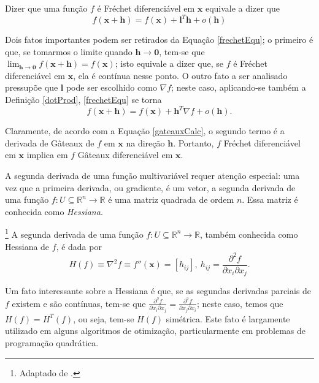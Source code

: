 Dizer que uma fun\c{c}\~{a}o $f$ \'{e} Fr\'{e}chet diferenci\'{a}vel em $\mathbf{x}$ equivale a dizer que
\begin{equation}
\label{frechetEqu}
f(\mathbf{x} + \mathbf{h}) = f(\mathbf{x}) + \mathbf{l}^T\mathbf{h} + o(\mathbf{h})
\end{equation}

Dois fatos importantes podem ser retirados da Equa\c{c}\~{a}o \eqref{frechetEqu}; o primeiro \'{e} que, se tomarmos o limite quando $\mathbf{h} \to \mathbf{0}$, tem-se que $\lim_{\mathbf{h} \to \mathbf{0}} f(\mathbf{x} + \mathbf{h}) = f(\mathbf{x})$; isto equivale a dizer que, se $f$ \'{e} Fr\'{e}chet diferenci\'{a}vel em $\mathbf{x}$, ela \'{e} cont\'{i}nua nesse ponto. O outro fato a ser analisado pressup\~{o}e que $\mathbf{l}$ pode ser escolhido como $\nabla f$; neste caso, aplicando-se tamb\'{e}m a Defini\c{c}\~{a}o \ref{dotProd}, \eqref{frechetEqu} se torna
\begin{equation}
\label{frechetEqu2}
f(\mathbf{x} + \mathbf{h}) = f(\mathbf{x}) + \mathbf{h}^T \nabla f + o(\mathbf{h}).
\end{equation}

Claramente, de acordo com a Equa\c{c}\~{a}o \ref{gateauxCalc}, o segundo termo \'{e} a derivada de G\^{a}teaux de $f$ em $\mathbf{x}$ na dire\c{c}\~{a}o $\mathbf{h}$. Portanto, $f$ Fr\'{e}chet diferenci\'{a}vel em $\mathbf{x}$ implica em $f$ G\^{a}teaux diferenci\'{a}vel em $\mathbf{x}$.

A segunda derivada de uma fun\c{c}\~{a}o multivari\'{a}vel requer aten\c{c}\~{a}o especial: uma vez que a primeira derivada, ou gradiente, \'{e} um vetor, a segunda derivada de uma fun\c{c}\~{a}o $f: U \subseteq \mathbb{R}^{n} \to \mathbb{R}$ \'{e} uma matriz quadrada de ordem $n$. Essa matriz \'{e} conhecida como \textit{Hessiana}.

\begin{definition}\footnote{Adaptado de \cite[p. 51]{yang}.}
A segunda derivada de uma fun\c{c}\~{a}o $f: U \subseteq \mathbb{R}^{n} \to \mathbb{R}$, tamb\'{e}m conhecida como Hessiana de $f$, \'{e} dada por
\begin{equation}
H(f) \equiv \nabla^2 f \equiv f''(\mathbf{x}) = [h_{ij}],~h_{ij} = \frac{\partial^2 f}{\partial x_i \partial x_j}.
\end{equation}
\end{definition}

Um fato interessante sobre a Hessiana \'{e} que, se as segundas derivadas parciais de $f$ existem e s\~{a}o cont\'{i}nuas, tem-se que $\frac{\partial^2 f}{\partial x_i \partial x_j} = \frac{\partial^2 f}{\partial x_j \partial x_i}$; neste caso, temos que $H(f) = H^{T}(f)$, ou seja, tem-se $H(f)$ sim\'{e}trica. Este fato \'{e} largamente utilizado em alguns algoritmos de otimiza\c{c}\~{a}o, particularmente em problemas de programa\c{c}\~{a}o quadr\'{a}tica.


